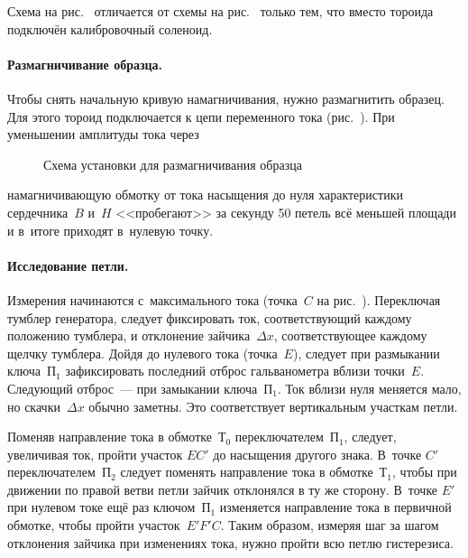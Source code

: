 Схема на рис.~ отличается от схемы на
рис.~ только тем, что вместо тороида
подключён калибровочный соленоид.

%

\paragraph{Размагничивание образца.}
Чтобы снять начальную кривую намагничивания, нужно размагнитить образец.
Для этого тороид подключается к цепи переменного тока
(рис.~). При уменьшении амплитуды тока через
\begin{wrapfigure}[8]{r}{0.45\textwidth}
	\caption{Схема установки для размагничивания образца}
\end{wrapfigure}
намагничивающую обмотку от тока насыщения до нуля характеристики сердечника~$B$
и~$H$ <<пробегают>> за секунду 50 петель всё меньшей площади и в~итоге
приходят в~нулевую точку.

\paragraph{Исследование петли.}
Измерения начинаются с~максимального тока (точка~$C$ на рис.~). Переключая тумблер генератора,
следует фиксировать ток, соответствующий каждому положению тумблера, и
отклонение зайчика~$\Delta x$, соответствующее
каждому щелчку тумблера. Дойдя до нулевого тока
(точка~$E$), следует при размыкании ключа~$\text{П}_1$ зафиксировать последний
отброс гальванометра вблизи точки~$E$. Следующий
отброс~--- при замыкании ключа~$\text{П}_1$. Ток вблизи нуля меняется мало, но
скачки~$\Delta x$ обычно заметны. Это соответствует
вертикальным участкам петли.

Поменяв направление тока в обмотке~Т$_0$ переключателем~$\text{П}_1$,
следует, увеличивая ток, пройти участок $EC'$ до
насыщения другого знака. В~точке $C'$ переключателем~$\text{П}_2$ следует
поменять направление тока в обмотке~$Т_{1}$, чтобы при
движении по правой ветви петли зайчик отклонялся в ту же сторону. В~точке $E'$
при нулевом токе ещё раз ключом~$\text{П}_1$
изменяется направление тока в первичной обмотке, чтобы пройти участок~$E'F'C$.
Таким образом, измеряя шаг за шагом
отклонения зайчика при изменениях тока, нужно пройти всю петлю гистерезиса.

